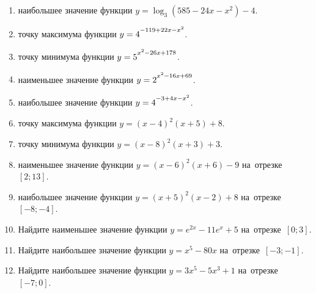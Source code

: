 \documentclass[a4paper,10pt]{article}
\begin{document}
\begin{enumerate}
\item {} наибольшее значение функции $y=\log_3\left(585-24x-x^2\right)-4$.

\item {} точку максимума функции $y=4\strut^{-119+22x-x^2}$.

\item {} точку минимума функции $y=5\strut^{x^2-26x+178}$.

\item {} наименьшее значение функции $y=2\strut^{x^2-16x+69}$.

\item {} наибольшее значение функции $y=4\strut^{-3+4x-x^2}$.

\item {} точку максимума функции $y=\left(x-4\right)^2\left(x+5\right)+8$.

\item {} точку минимума функции $y=\left(x-8\right)^2\left(x+3\right)+3$.

\item {} наименьшее значение функции $y=\left(x-6\right)^2\left(x+6\right)-9$ на~отрезке~$\left[2;13\right]$.

\item {} наибольшее значение функции $y=\left(x+5\right)^2\left(x-2\right)+8$ на~отрезке~$\left[-8;-4\right]$.

\item Найдите наименьшее значение функции $y=e^{2x}-11e^x+5$ на~отрезке~$\left[0;3\right]$.

\item Найдите наибольшее значение функции $y=x^5-80x$ на~отрезке~$\left[-3;-1\right]$.

\item Найдите наибольшее значение функции $y=3x^5-5x^3+1$ на~отрезке~$\left[-7;0\right]$.

\end{enumerate}
\end{document}
